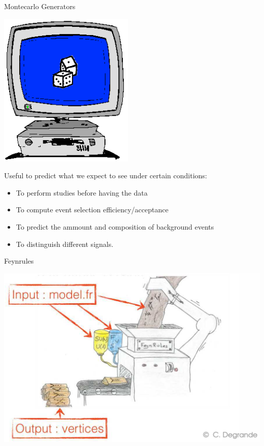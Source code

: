 \documentclass{../bredelebeamer}
\begin{document}
\begin{frame}{Montecarlo Generators}
	

	\begin{center}
		\includegraphics[scale=0.5]{../2023_paper/A1}
	\end{center}

	Useful to predict what we expect to see under certain conditions:
	\begin{itemize}
		\item To perform studies before having the data
		\item To compute event selection efficiency/acceptance
		\item  To predict the ammount and composition of background events
		\item To distinguish different signals. 
	\end{itemize}
	
\end{frame}

\begin{frame}{Feynrules}
	\begin{center}
		\includegraphics[width=.99\linewidth]{../2023_paper/Feynrules.png}
	\end{center}
\end{frame}
\end{document}

